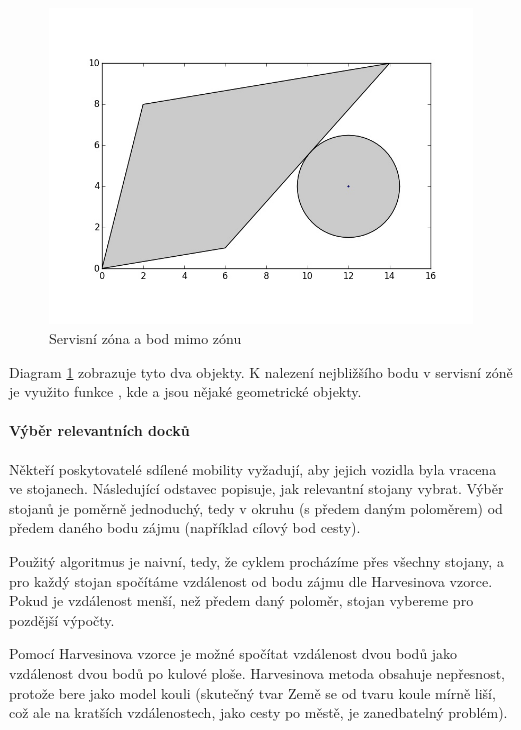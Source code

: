 \documentclass[thesis=M,czech]{FITthesis}[2019/12/23]
\theoremstyle{plain}
\theoremstyle{definition}
\begin{document}
\begin{figure}[H]\centering
	\includegraphics[width=1\textwidth]{graphs/service-zone-selection.jpg}

	\caption[Servisní zóna a bod mimo zónu]{Servisní zóna a bod mimo zónu}\label{fig:service-zone}

\end{figure}

Diagram \ref{fig:service-zone} zobrazuje tyto dva objekty. K nalezení nejbližšího bodu v servisní zóně je využito funkce , kde  a  jsou nějaké geometrické objekty.

\paragraph{Výběr relevantních docků}\label{vyber-docku}

Někteří poskytovatelé sdílené mobility vyžadují, aby jejich vozidla byla vracena ve stojanech. Následující odstavec popisuje, jak relevantní stojany vybrat. Výběr stojanů je poměrně jednoduchý, tedy v okruhu (s předem daným poloměrem) od předem daného bodu zájmu (například cílový bod cesty).

Použitý algoritmus je naivní, tedy, že cyklem procházíme přes všechny stojany, a pro každý stojan spočítáme vzdálenost od bodu zájmu dle Harvesinova vzorce. Pokud je vzdálenost menší, než předem daný poloměr, stojan vybereme pro pozdější výpočty.

Pomocí Harvesinova vzorce\cite{harvesine} je možné spočítat vzdálenost dvou bodů jako vzdálenost dvou bodů po kulové ploše. Harvesinova metoda obsahuje nepřesnost, protože bere jako model kouli (skutečný tvar Země se od tvaru koule mírně liší, což ale na kratších vzdálenostech, jako cesty po městě, je zanedbatelný problém). 
\end{document}
